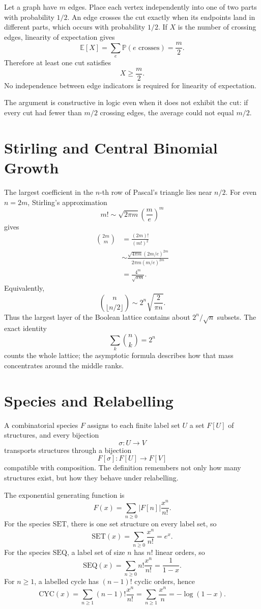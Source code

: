 Let a graph have \(m\) edges.  Place each vertex independently into one of two parts with probability \(1/2\).  An edge crosses the cut exactly when its endpoints land in different parts, which occurs with probability \(1/2\).  If \(X\) is the number of crossing edges, linearity of expectation gives
\[
  \mathbb E[X]
  =\sum_{e}\mathbb P(e\text{ crosses})
  =\frac m2.
\]
Therefore at least one cut satisfies
\[
  X\ge\frac m2.
\]
No independence between edge indicators is required for linearity of expectation.

The argument is constructive in logic even when it does not exhibit the cut: if every cut had fewer than \(m/2\) crossing edges, the average could not equal \(m/2\).

\section{Stirling and Central Binomial Growth}

The largest coefficient in the \(n\)-th row of Pascal's triangle lies near \(n/2\).  For even \(n=2m\), Stirling's approximation
\[
  m!\sim\sqrt{2\pi m}\left(\frac me\right)^m
\]
gives
\[
\begin{aligned}
  \binom{2m}{m}
  &=\frac{(2m)!}{(m!)^2}\\
  &\sim
  \frac{\sqrt{4\pi m}(2m/e)^{2m}}
       {2\pi m(m/e)^{2m}}\\
  &=\frac{4^m}{\sqrt{\pi m}}.
\end{aligned}
\]
Equivalently,
\[
  \boxed{
  \binom n{\lfloor n/2\rfloor}
  \sim
  2^n\sqrt{\frac{2}{\pi n}}.}
\]
Thus the largest layer of the Boolean lattice contains about \(2^n/\sqrt n\) subsets.  The exact identity
\[
  \sum_k\binom nk=2^n
\]
counts the whole lattice; the asymptotic formula describes how that mass concentrates around the middle ranks.

\section{Species and Relabelling}

A combinatorial species \(F\) assigns to each finite label set \(U\) a set \(F[U]\) of structures, and every bijection
\[
  \sigma:U\to V
\]
transports structures through a bijection
\[
  F[\sigma]:F[U]\to F[V]
\]
compatible with composition.  The definition remembers not only how many structures exist, but how they behave under relabelling.

The exponential generating function is
\[
  F(x)=
  \sum_{n\ge0}
  |F[n]|\frac{x^n}{n!}.
\]
For the species \(\mathrm{SET}\), there is one set structure on every label set, so
\[
  \mathrm{SET}(x)
  =\sum_{n\ge0}\frac{x^n}{n!}
  =e^x.
\]
For the species \(\mathrm{SEQ}\), a label set of size \(n\) has \(n!\) linear orders, so
\[
  \mathrm{SEQ}(x)
  =\sum_{n\ge0}n!\frac{x^n}{n!}
  =\frac1{1-x}.
\]
For \(n\ge1\), a labelled cycle has \((n-1)!\) cyclic orders, hence
\[
  \mathrm{CYC}(x)
  =\sum_{n\ge1}(n-1)!\frac{x^n}{n!}
  =\sum_{n\ge1}\frac{x^n}{n}
  =-\log(1-x).
\]

